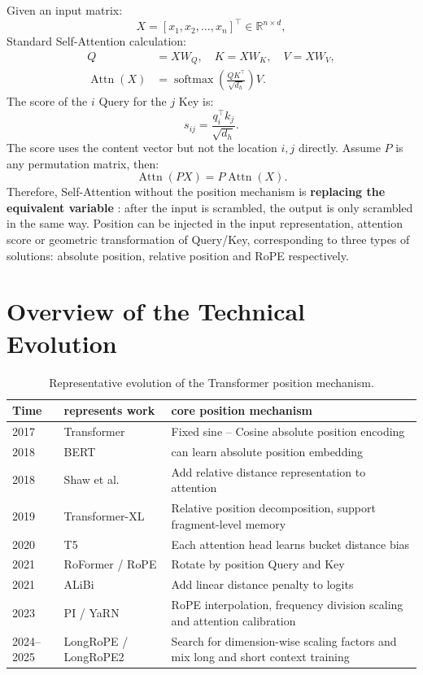 \documentclass[UTF8,fontset=none,a4paper,10pt]{ctexart}
\newcommand{\term}[1]{\textbf{#1}}
\newcommand{\R}{\mathbb{R}}
\newcommand{\softmax}{\operatorname{softmax}}
\newcommand{\Attn}{\operatorname{Attn}}
\begin{document}
Given an input matrix:
\begin{equation}
  X=[x_1,x_2,\ldots,x_n]^\top\in\R^{n\times d},
  \label{eq:input}
\end{equation}
Standard Self-Attention calculation:
\begin{align}
  Q&=XW_Q,\quad K=XW_K,\quad V=XW_V, \label{eq:qkv}\\
  \Attn(X)&=\softmax\!\left(\frac{QK^\top}{\sqrt{d_h}}\right)V. \label{eq:attention}
\end{align}
The score of the $i$ Query for the $j$ Key is:
\begin{equation}
  s_{ij}=\frac{q_i^\top k_j}{\sqrt{d_h}}.
  \label{eq:score}
\end{equation}
The score uses the content vector but not the location $i,j$ directly. Assume $P$ is any permutation matrix, then:
\begin{equation}
  \Attn(PX)=P\Attn(X).
  \label{eq:permutation}
\end{equation}
Therefore, Self-Attention without the position mechanism is \term{ replacing the equivalent variable }: after the input is scrambled, the output is only scrambled in the same way. Position can be injected in the input representation, attention score or geometric transformation of Query/Key, corresponding to three types of solutions: absolute position, relative position and RoPE respectively.

\section{Overview of the Technical Evolution}

\begin{table}[htbp]
\centering
\small
\begin{tabularx}{\linewidth}{@{}p{1.2cm}p{3.5cm}X@{}}
\toprule
Time & represents work & core position mechanism \\
\midrule
2017 & Transformer & Fixed sine -- Cosine absolute position encoding \\
2018 & BERT & can learn absolute position embedding \\
2018 & Shaw et al. & Add relative distance representation to attention \\
2019 & Transformer-XL & Relative position decomposition, support fragment-level memory \\
2020 & T5 & Each attention head learns bucket distance bias \\
2021 & RoFormer / RoPE & Rotate by position Query and Key \\
2021 & ALiBi & Add linear distance penalty to logits \\
2023 & PI / YaRN & RoPE interpolation, frequency division scaling and attention calibration \\
2024--2025 & LongRoPE / LongRoPE2 & Search for dimension-wise scaling factors and mix long and short context training \\
\bottomrule
\end{tabularx}
\caption{Representative evolution of the Transformer position mechanism.}
\label{tab:timeline}
\end{table}
\end{document}

